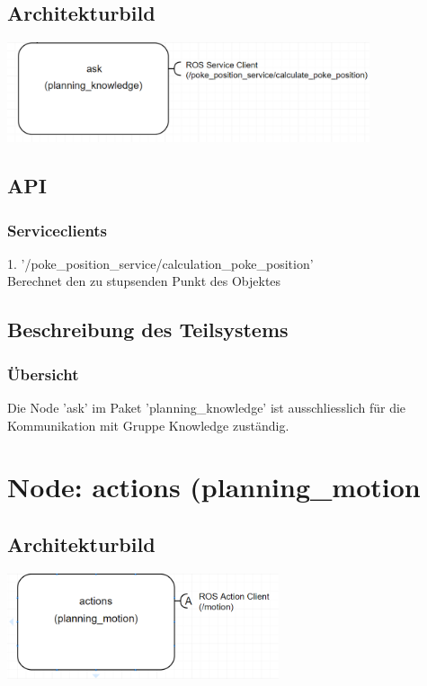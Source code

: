 \documentclass{suturo}
\begin{document}
\subsection{Architekturbild}
\begin{center} \includegraphics[width=0.8\textwidth]{img/diag_planning_knowledge.png} \end{center}
\subsection{API}
\subsubsection{Serviceclients}
1. '/poke\_position\_service/calculation\_poke\_position' \\
Berechnet den zu stupsenden Punkt des Objektes
\subsection{Beschreibung des Teilsystems}
\subsubsection{\"Ubersicht}
Die Node 'ask' im Paket 'planning\_knowledge' ist ausschliesslich für die Kommunikation mit Gruppe Knowledge zust\"andig.

\section{Node: actions (planning\_motion}
\subsection{Architekturbild}
\begin{center} \includegraphics[width=0.6\textwidth]{img/diag_planning_motion.png} \end{center}
\end{document}
